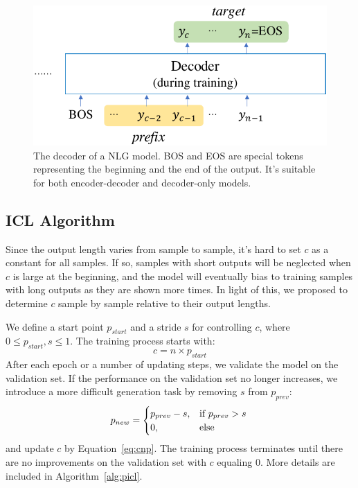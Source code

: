  
 \begin{figure}[th]
 	\centering
 	\includegraphics[scale=0.45]{decoder.pdf}
 	\caption{The decoder of a NLG model. BOS and EOS are special tokens representing the beginning and the end of the output. It's suitable for both encoder-decoder and decoder-only models.} 
 	\label{fig:decoder}
 \end{figure}
 
 
\subsection{ICL Algorithm}
\label{sec:iclalgorithm}
Since the output length varies from sample to sample, it's hard to set $c$ as a constant for all samples.
If so, samples with short outputs will be neglected when $c$ is large at the beginning, and the model will eventually bias to training samples with long outputs as they are shown more times.
In light of this, we proposed to determine $c$ sample by sample relative to their output lengths.

We define a start point $p_{start}$ and a stride $s$ for controlling $c$, where $0\leq p_{start}, s \leq 1$.
The training process starts with: 
\begin{equation}
	c = n\times p_{start}
	\label{eq:cnp}
\end{equation}
After each epoch or a number of updating steps, we validate the model on the validation set. If the performance on the validation set no longer increases, we introduce a more difficult generation task 
by removing $s$ from $p_{prev}$:
\begin{equation*}
	p_{new} = 
	\begin{cases}
	p_{prev}-s, & \text{if $p_{prev}>s$} \\
	0, & \text{else}
	\end{cases} \\
\end{equation*}
and update $c$ by Equation~\ref{eq:cnp}. The training process terminates until there are no improvements on the validation set with $c$ equaling 0.
More details are included in Algorithm~\ref{alg:picl}. %

